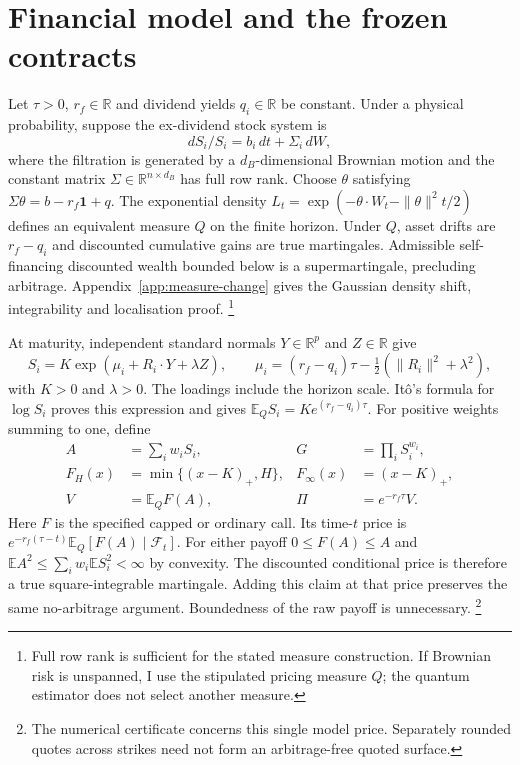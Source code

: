\documentclass[11pt]{article}
\newcommand{\E}{\mathbb E}
\newcommand{\R}{\mathbb R}
\begin{document}
\section{Financial model and the frozen contracts}
\label{sec:model}

Let $\tau>0$, $r_f\in\R$ and dividend yields $q_i\in\R$ be constant.
Under a physical probability, suppose the ex-dividend stock system is
\begin{equation}
 dS_i/S_i=b_i\,dt+\Sigma_i\,dW,
\end{equation}
where the filtration is generated by a $d_B$-dimensional Brownian motion
and the constant matrix $\Sigma\in\R^{n\times d_B}$ has full row rank.
Choose $\theta$ satisfying
$\Sigma\theta=b-r_f\mathbf1+q$.  The exponential density $L_t=\exp(-\theta\cdot W_t-\|\theta\|^2t/2)$
defines an equivalent measure $Q$ on the finite horizon. Under $Q$, asset
drifts are $r_f-q_i$ and discounted cumulative gains are true martingales.
Admissible self-financing discounted wealth bounded below is a
supermartingale, precluding arbitrage. Appendix~\ref{app:measure-change}
gives the Gaussian density shift, integrability and localisation proof.
\footnote{Full row rank is sufficient for the stated measure construction.
If Brownian risk is unspanned, I use the stipulated pricing measure $Q$;
the quantum estimator does not select another measure.}

At maturity, independent standard normals $Y\in\R^p$ and $Z\in\R$ give
\begin{equation}
 S_i=K\exp(\mu_i+R_i\cdot Y+\lambda Z),\qquad
 \mu_i=(r_f-q_i)\tau-\tfrac12(\|R_i\|^2+\lambda^2),
 \label{eq:stocks}
\end{equation}
with $K>0$ and $\lambda>0$.  The loadings include the horizon scale.
It\^o's formula for $\log S_i$ proves this expression and gives
$\E_QS_i=Ke^{(r_f-q_i)\tau}$.  For positive weights summing to one, define
\begin{equation}
 \begin{aligned}
 A&=\sum_iw_iS_i, &G&=\prod_iS_i^{w_i},\\
 F_H(x)&=\min\{(x-K)_+,H\}, &F_\infty(x)&=(x-K)_+,\\
 V&=\E_QF(A), &\Pi&=e^{-r_f\tau}V.
 \end{aligned}
 \label{eq:financial-target}
\end{equation}
Here $F$ is the specified capped or ordinary call. Its time-$t$ price is
$e^{-r_f(\tau-t)}\E_Q[F(A)\mid\mathcal F_t]$.
For either payoff $0\leq F(A)\leq A$ and
$\E A^2\leq\sum_iw_i\E S_i^2<\infty$ by convexity.
The discounted conditional price is therefore a true square-integrable
martingale. Adding this claim at that price preserves the same no-arbitrage
argument. Boundedness of the raw payoff is unnecessary.  \footnote{The numerical certificate concerns this single model price.
Separately rounded quotes across strikes need not form an arbitrage-free
quoted surface.}
\end{document}
